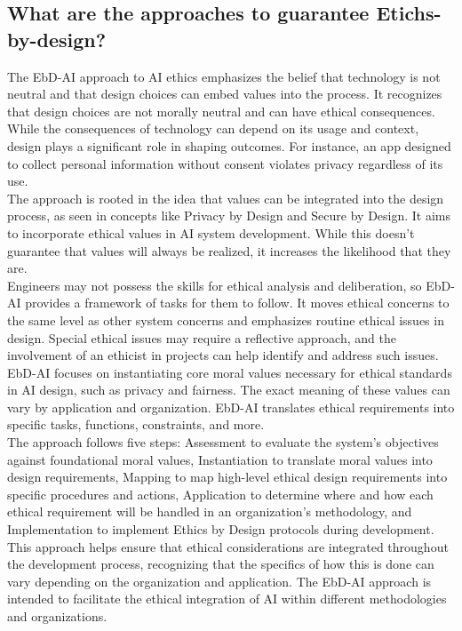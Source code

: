\documentclass{article}
\begin{document}
\newpage
\subsection{What are the approaches to guarantee Etichs-by-design?}
The EbD-AI approach to AI ethics emphasizes the belief that technology \cite{articleebd} is not neutral and that design choices can embed values into the process. It recognizes that design choices are not morally neutral and can have ethical consequences. While the consequences of technology can depend on its usage and context, design plays a significant role in shaping outcomes. For instance, an app designed to collect personal information without consent violates privacy regardless of its use. \\
The approach is rooted in the idea that values can be integrated into the design process, as seen in concepts like Privacy by Design and Secure by Design. It aims to incorporate ethical values in AI system development. While this doesn't guarantee that values will always be realized, it increases the likelihood that they are. \\
Engineers may not possess the skills for ethical analysis and deliberation, so EbD-AI provides a framework of tasks for them to follow. It moves ethical concerns to the same level as other system concerns and emphasizes routine ethical issues in design. Special ethical issues may require a reflective approach, and the involvement of an ethicist in projects can help identify and address such issues. \\
EbD-AI focuses on instantiating core moral values necessary for ethical standards in AI design, such as privacy and fairness. The exact meaning of these values can vary by application and organization. EbD-AI translates ethical requirements into specific tasks, functions, constraints, and more. \\
The approach follows five steps: Assessment to evaluate the system's objectives against foundational moral values, Instantiation to translate moral values into design requirements, Mapping to map high-level ethical design requirements into specific procedures and actions, Application to determine where and how each ethical requirement will be handled in an organization's methodology, and Implementation to implement Ethics by Design protocols during development. \\
This approach helps ensure that ethical considerations are integrated throughout the development process, recognizing that the specifics of how this is done can vary depending on the organization and application. The EbD-AI approach is intended to facilitate the ethical integration of AI within different methodologies and organizations. \\
\end{document}
